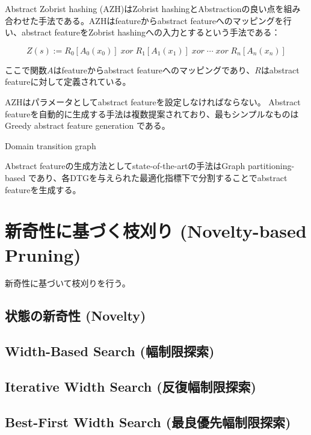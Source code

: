 \documentclass[b5paper]{report}
\begin{document}
Abstract Zobrist hashing (AZH)はZobrist hashingとAbstractionの良い点を組み合わせた手法である\cite{jinnai2016structured}。AZHはfeatureからabstract featureへのマッピングを行い、abstract featureをZobrist hashingへの入力とするという手法である：

\begin{equation}
\label{eq:abstract-zobrist}
 	Z(s) := R_{0}[A_0(x_{0})]\; xor\; R_{1}[A_1(x_{1})]\; xor\; \cdots\; xor\; R_{n}[A_n(x_{n})]%
\end{equation}

ここで関数$A$はfeatureからabstract featureへのマッピングであり、$R$はabstract featureに対して定義されている。

AZHはパラメータとしてabstract featureを設定しなければならない。
Abstract featureを自動的に生成する手法は複数提案されており、最もシンプルなものはGreedy abstract feature generation \cite{jinnai2016automated}である。

Domain transition graph

Abstract featureの生成方法としてstate-of-the-artの手法はGraph partitioning-based \cite{jinnai2017work}であり、各DTGを与えられた最適化指標下で分割することでabstract featureを生成する。


\section{新奇性に基づく枝刈り (Novelty-based Pruning)}
\label{sec:novelty-based-pruning}

新奇性に基づいて枝刈りを行う。

\subsection{状態の新奇性 (Novelty)}
\label{sec:novelty}


\subsection{Width-Based Search (幅制限探索)}
\label{sec:width-based-search}

\subsection{Iterative Width Search (反復幅制限探索)}
\label{sec:iterative-width-search}

\subsection{Best-First Width Search (最良優先幅制限探索)}
\label{sec:width-based-heuristic-search}
\end{document}
